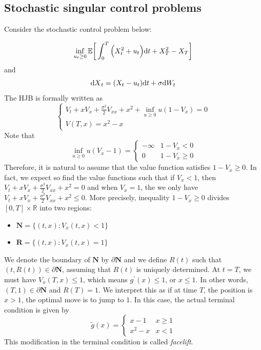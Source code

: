 \documentclass[11pt]{book}
\newcommand{\dt}{\text{\normalfont d}t}
\newcommand{\dX}{\text{\normalfont d}X}
\newcommand{\dW}{\text{\normalfont d}W}
\begin{document}
\subsection{Stochastic singular control problems}
Consider the stochastic control problem below:
\begin{eg}
    \begin{equation}
        \inf_{u_t\ge0}\mathbb{E}\bigg[\int_0^T\Big(X_t^2 + u_t\Big){\dt}+ X_T^2- X_T\bigg]
    \end{equation}
    and 
    \begin{equation}
        {\dX}_t=(X_t-u_t){\dt}+\sigma \dW_t
    \end{equation}
    The HJB  is formally written as 
    \begin{equation}
        \begin{cases}
            {V}_{t} + x V_{x} + \frac{\sigma^2}{2}V_{xx} + x^2 + \inf_{u\ge0} u(1-V_{x})=0\\
            V(T,x)=x^2-x
        \end{cases}
    \end{equation}
    Note that 
    \begin{equation}
        \inf_{u\ge0} u( V_{x}-1)=
        \begin{cases}
            -\infty &  1-V_{x}<0\\
            0 &  1-V_{x}\ge0
        \end{cases}
    \end{equation}
    Therefore, it is natural to assume that the value function satisfies $ 1-V_{x}\ge0$. In fact, we expect so find the value functions such that if $ V_{x}< 1$, then ${V}_{t} + x V_{x} + \frac{\sigma^2}{2}V_{xx} + x^2=0$ and when $ V_{x}=1$, the we only have ${V}_{t} + x V_{x} + \frac{\sigma^2}{2}V_{xx} + x^2\le 0$. More precisely, inequality $ 1-V_{x}\ge0$ divides $[0,T]\times\mathbb{R}$ into two regions: 
    \begin{itemize}
        \item $\mathbf{N} = \{(t,x):  V_{x}(t,x)<1\}$
        \item $\mathbf{R} = \{(t,x):  V_{x}(t,x)=1\}$
    \end{itemize}
    We denote the boundary of $\mathbf{N}$ by $\partial \mathbf{N}$ and we define $R(t)$ such that $(t,R(t))\in\partial\mathbf{N}$, assuming that $R(t)$ is uniquely determined.
    At $t=T$, we must have $V_x(T,x)\le 1$, which means $g^\prime(x)\le 1$, or $x\le 1$. In other words, $(T,1)\in\partial \mathbf{N}$ and $R(T)=1$. 
We interpret this as if at time $T$, the position is $x>1$, the optimal move is to jump to $1$. In this case, the actual terminal condition is given by
\[
\tilde{g}(x)=\begin{cases}
    x-1&x\ge1\\
    x^2-x&x<1
\end{cases}
\]
This modification in the terminal condition is called \emph{facelift}.




\end{eg}
\end{document}
